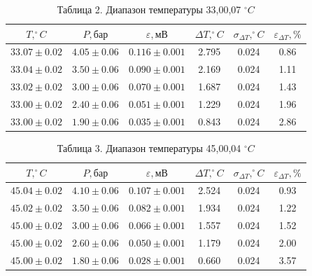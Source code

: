 \documentclass[a4paper]{article}
\begin{document}
\begin{enumerate}
\begin{table}[h!]
    \centering
    \begin{tabular}{|c|c|c|c|c|c|}
        \hline
        $T, ^\circ C$ & $P, \text{бар}$ & $\varepsilon, \text{мВ}$ & $\Delta T, ^\circ C$ & $\sigma_{\Delta T}, ^\circ C$ & $\varepsilon_{\Delta T}, \%$ \\
        \hline
        $33.07 \pm 0.02$ & $4.05 \pm 0.06$ & $0.116 \pm 0.001$ & 2.795 & 0.024 & 0.86 \\ \hline
        $33.04 \pm 0.02$ & $3.50 \pm 0.06$ & $0.090 \pm 0.001$ & 2.169 & 0.024 & 1.11 \\ \hline
        $33.02 \pm 0.02$ & $3.00 \pm 0.06$ & $0.070 \pm 0.001$ & 1.687 & 0.024 & 1.43 \\ \hline
        $33.00 \pm 0.02$ & $2.40 \pm 0.06$ & $0.051 \pm 0.001$ & 1.229 & 0.024 & 1.96 \\ \hline
        $33.00 \pm 0.02$ & $1.90 \pm 0.06$ & $0.035 \pm 0.001$ & 0.843 & 0.024 & 2.86 \\
        \hline
    \end{tabular}
    \caption{Таблица 2. Диапазон температуры 33,00,07 $^\circ C$}
\end{table}

\begin{table}[h!]
    \centering
    \begin{tabular}{|c|c|c|c|c|c|}
        \hline
        $T, ^\circ C$ & $P, \text{бар}$ & $\varepsilon, \text{мВ}$ & $\Delta T, ^\circ C$ & $\sigma_{\Delta T}, ^\circ C$ & $\varepsilon_{\Delta T}, \%$ \\
        \hline
        $45.04 \pm 0.02$ & $4.10 \pm 0.06$ & $0.107 \pm 0.001$ & 2.524 & 0.024 & 0.93 \\ \hline
        $45.02 \pm 0.02$ & $3.50 \pm 0.06$ & $0.082 \pm 0.001$ & 1.934 & 0.024 & 1.22 \\ \hline
        $45.00 \pm 0.02$ & $3.00 \pm 0.06$ & $0.066 \pm 0.001$ & 1.557 & 0.024 & 1.52 \\ \hline
        $45.00 \pm 0.02$ & $2.60 \pm 0.06$ & $0.050 \pm 0.001$ & 1.179 & 0.024 & 2.00 \\ \hline
        $45.00 \pm 0.02$ & $1.80 \pm 0.06$ & $0.028 \pm 0.001$ & 0.660 & 0.024 & 3.57 \\
        \hline
    \end{tabular}
    \caption{Таблица 3. Диапазон температуры 45,00,04 $^\circ C$}
\end{table}


\end{enumerate}
\end{document}
